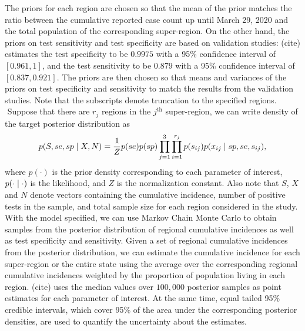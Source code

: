 The priors for each region are chosen so that the mean of the prior matches the ratio between the cumulative reported case count up until March 29, 2020 and the total population of the corresponding super-region. On the other hand, the priors on test sensitivity and test specificity are based on validation studies: (cite) estimates the test specificity to be $0.9975$ with a 95\% confidence interval of $[0.961, 1]$, and the test sensitivity to be $0.879$ with a 95\% confidence interval of $[0.837, 0.921]$. The priors are then chosen so that means and variances of the priors on test specificity and sensitivity to match the results from the validation studies. Note that the subscripts denote truncation to the specified regions.\\
\newline$ $
Suppose that there are $r_j$ regions in the $j^\text{th}$ super-region, we can write density of the target posterior distribution as
\[
p(S, se, sp \mid X, N) = \frac{1}{Z}p(se)p(sp)\prod_{j=1}^3\prod_{i=1}^{r_j} p(s_{ij})p(x_{ij}\mid sp, se, s_{ij}),
\]
where $p(\cdot)$ is the prior density corresponding to each parameter of interest, $p(\cdot \mid \cdot)$ is the likelihood, and $Z$ is the normalization constant. Also note that $S$, $X$ and $N$ denote vectors containing the cumulative incidence, number of positive tests in the sample, and total sample size for each region considered in the study. With the model specified, we can use Markov Chain Monte Carlo to obtain samples from the posterior distribution of regional cumulative incidences as well as test specificity and sensitivity. Given a set of regional cumulative incidences from the posterior distribution, we can estimate the cumulative incidence for each super-region or the entire state using the average over the corresponding regional cumulative incidences weighted by the proportion of population living in each region. (cite) uses the median values over $100,000$ posterior samples as point estimates for each parameter of interest. At the same time, equal tailed 95\% credible intervals, which cover 95\% of the area under the corresponding posterior densities, are used to quantify the uncertainty about the estimates.
